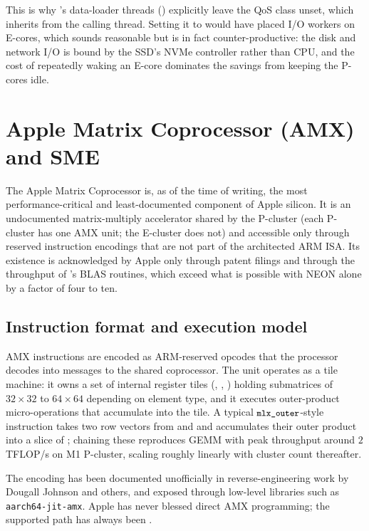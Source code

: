 This is why \Lucid's data-loader threads
() explicitly leave the QoS class unset,
which inherits  from the calling thread. Setting
it to  would have placed I/O workers on E-cores, which
sounds reasonable but is in fact counter-productive: the disk and
network I/O is bound by the SSD's NVMe controller rather than CPU,
and the cost of repeatedly waking an E-core dominates the savings
from keeping the P-cores idle.

\section{Apple Matrix Coprocessor (AMX) and SME}
\label{sec:apple_silicon:amx}

The Apple Matrix Coprocessor is, as of the time of writing, the most
performance-critical and least-documented component of Apple silicon.
It is an undocumented matrix-multiply accelerator shared by the
P-cluster (each P-cluster has one AMX unit; the E-cluster does not)
and accessible only through reserved instruction encodings that are
not part of the architected ARM ISA. Its existence is acknowledged by
Apple only through patent filings and through the throughput of
\Accelerate's BLAS routines, which exceed what is possible with NEON
alone by a factor of four to ten.

\subsection{Instruction format and execution model}
\label{ssec:apple_silicon:amx_isa}

AMX instructions are encoded as ARM-reserved opcodes that the
processor decodes into messages to the shared coprocessor. The unit
operates as a tile machine: it owns a set of internal register tiles
(, , ) holding submatrices of $32 \times 32$
to $64 \times 64$ depending on element type, and it executes
outer-product micro-operations that accumulate into the 
tile. A typical $\texttt{\small mlx\_outer}$-style instruction takes two row
vectors from  and  and accumulates their outer
product into a slice of ; chaining these reproduces GEMM with
peak throughput around $2$\,TFLOP/s on M1 P-cluster, scaling roughly
linearly with cluster count thereafter.

The encoding has been documented unofficially in reverse-engineering
work by Dougall Johnson and others, and exposed through low-level
libraries such as \texttt{aarch64-jit-amx}. Apple has never blessed
direct AMX programming; the supported path has always been
\Accelerate.


